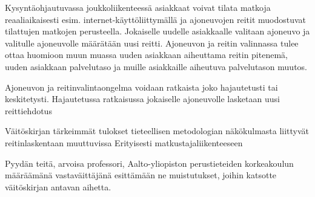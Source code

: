 \documentclass[a4paper,12pt]{article}
\begin{document}
Kysyntäohjautuvassa joukkoliikenteessä asiakkaat voivat tilata matkoja reaaliaikaisesti esim. internet-käyttöliittymällä ja 
ajoneuvojen reitit muodostuvat tilattujen matkojen perusteella. Jokaiselle uudelle asiakkaalle valitaan ajoneuvo ja 
valitulle ajoneuvolle määrätään uusi reitti. Ajoneuvon ja reitin valinnassa tulee ottaa huomioon muun muassa 
uuden asiakkaan aiheuttama reitin pitenemä, uuden asiakkaan palvelutaso ja muille asiakkaille aiheutuva palvelutason muutos.

Ajoneuvon ja reitinvalintaongelma voidaan ratkaista joko hajautetusti tai keskitetysti. Hajautetussa ratkaisussa jokaiselle ajoneuvolle
lasketaan uusi reittiehdotus






Väitöskirjan tärkeimmät tulokset tieteellisen metodologian näkökulmasta liittyvät reitinlaskentaan muuttuvissa
Erityisesti matkustajaliikenteeseen




Pyydän teitä, arvoisa professori, Aalto-yliopiston perustieteiden korkeakoulun määräämänä vastaväittäjänä esittämään ne muistutukset, joihin katsotte väitöskirjan antavan aihetta.
\end{document}
